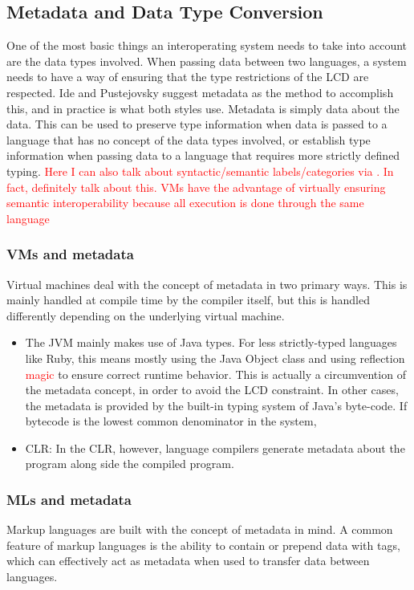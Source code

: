 \documentclass{sig-alternate}
\newcommand{\mycomment}[1]{\textcolor{red}{#1}}
\begin{document}
\subsection{Metadata and Data Type Conversion}\label{metadata} \mycomment{\cite{Ide:2010, Bromberg:2011, Hamilton:2003}}
One of the most basic things an interoperating system needs to take into account are the data types involved. 
When passing data between two languages, a system needs to have a way of ensuring that the type restrictions of the LCD are respected. Ide and Pustejovsky \cite{Ide:2010} suggest metadata as the method to accomplish this, and in practice is what both styles use. Metadata is simply data about the data. This can be used to preserve type information when data is passed to a language that has no concept of the data types involved, or establish type information when passing data to a language that requires more strictly defined typing.
\mycomment{Here I can also talk about syntactic/semantic labels/categories via \cite{Ide:2010}. In fact, definitely talk about this. VMs have the advantage of virtually ensuring semantic interoperability because all execution is done through the same language}
\subsubsection*{VMs and metadata}
Virtual machines deal with the concept of metadata in two primary ways. This is mainly handled at compile time by the compiler itself, but this is handled differently depending on the underlying virtual machine.
\begin{itemize}
\item The JVM mainly makes use of Java types. For less strictly-typed languages like Ruby, this means mostly using the Java Object class and using reflection \mycomment{magic} to ensure correct runtime behavior. This is actually a circumvention of the metadata concept, in order to avoid the LCD constraint. In other cases, the metadata is provided by the built-in typing system of Java's byte-code. If bytecode is the lowest common denominator in the system, 
\item CLR: In the CLR, however, language compilers generate metadata about the program along side the compiled program\cite{Hamilton:2003}.
\end{itemize}

\subsubsection*{MLs and metadata}
Markup languages are built with the concept of metadata in mind. A common feature of markup languages is the ability to contain or prepend data with tags, which can effectively act as metadata when used to transfer data between languages.
\end{document}
